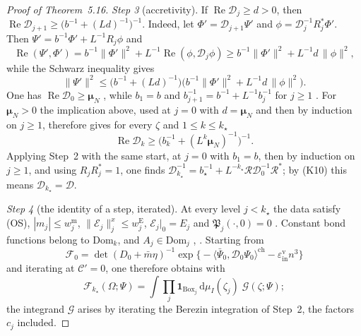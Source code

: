 \documentclass[11pt,letterpaper,reqno]{amsart}
\theoremstyle{definition}
\begin{document}
\begin{proof}[Proof of Theorem~5.16]
\emph{Step 3} (accretivity).
If $\operatorname{Re}\mathcal D_j\ge d>0$, then $\operatorname{Re}\mathcal D_{j+1}\ge\bigl(b^{-1}+(Ld)^{-1}\bigr)^{-1}$.
Indeed, let $\Phi'=\mathcal D_{j+1}\Psi'$ and $\phi=\mathcal D_j^{-1}R_j^*\Phi'$.
Then $\Psi'=b^{-1}\Phi'+L^{-1}R_j\phi$ and
\begin{equation*}
\operatorname{Re}(\Psi',\Phi')=b^{-1}\|\Phi'\|^2+L^{-1}\operatorname{Re}(\phi,\mathcal D_j\phi)\ge b^{-1}\|\Phi'\|^2+L^{-1}d\,\|\phi\|^2,
\end{equation*}
while the Schwarz inequality gives
\begin{equation*}
\|\Psi'\|^2\le\bigl(b^{-1}+(Ld)^{-1}\bigr)\bigl(b^{-1}\|\Phi'\|^2+L^{-1}d\,\|\phi\|^2\bigr).
\end{equation*}
One has $\operatorname{Re}\mathcal D_0\ge\boldsymbol\mu_N$ \cite[(I.O2)]{QEDIII}, while $b_1=b$ and $b_{j+1}^{-1}=b^{-1}+L^{-1}b_j^{-1}$ for $j\ge1$ \cite[Section~I.3.4]{QEDIII}.
For $\boldsymbol\mu_N>0$ the implication above, used at $j=0$ with $d=\boldsymbol\mu_N$ and then by induction on $j\ge1$, therefore gives for every $\zeta$ and $1\le k\le k_\star$
\begin{equation*}
\operatorname{Re}\mathcal D_k\ge\bigl(b_k^{-1}+(L^k\boldsymbol\mu_N)^{-1}\bigr)^{-1}.
\end{equation*}
Applying Step~2 with the same start, at $j=0$ with $b_1=b$, then by induction on $j\ge1$, and using $R_jR_j^*=1$, one finds $\mathcal D_{k_\star}^{-1}=\allowbreak b_\star^{-1}+L^{-k_\star}\mathcal R\mathcal D_0^{-1}\mathcal R^*$;
by (K10) this means $\mathcal D_{k_\star}=\mathcal D$.

\emph{Step 4} (the identity of a step, iterated).
At every level $j<k_\star$ the data satisfy (OS), $|m_j|\le w^{\mathrm m}_j$, $\|\mathscr E_j\|^x_j\le w^{\mathrm E}_j$, $\mathscr E_j|_0=E_j$ and $\mathfrak P_j(\cdot,0)=0$ \cite[Propositions~26.6\,(b), 28.1, 28.3\,(a), (b)]{QEDIII}.
Constant bond functions belong to $\mathrm{Dom}_k$, and $A_j\in\mathrm{Dom}_j$ \cite[Proposition~5.38\,(i), (ii)]{QEDI}, \cite{QEDIII}.
Starting from
\begin{equation*}
\mathscr F_0=\det(D_0+\bar m\eta)^{-1}\exp\bigl\{-\langle\bar\Psi_0,\mathcal D_0\Psi_0\rangle^{\mathrm{ch}}-\varepsilon^{\mathrm v}_{\mathrm{in}}n^3\bigr\}
\end{equation*}
\cite{QEDIII} and iterating \cite[Proposition~24.1\,(c)]{QEDIII} at $\mathscr C'=0$, one therefore obtains with \cite[(G5)$^{\mathrm w}$]{QEDIII}
\begin{equation*}
\mathscr F_{k_\star}(\Omega;\Psi)=\int\prod_j\mathbf 1_{\mathrm{Box}_j}\,\mathrm d\mu_I(\zeta_j)\;\mathcal G(\zeta;\Psi);
\end{equation*}
the integrand $\mathcal G$ arises by iterating the Berezin integration of Step~2, the factors $c_j$ included.


\end{proof}
\end{document}
